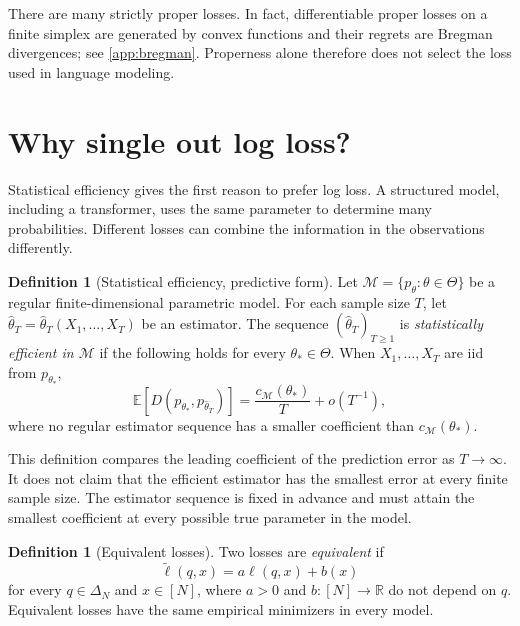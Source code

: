 \documentclass[11pt,twoside]{article}
\newcommand{\R}{\mathbb R}
\newcommand{\KL}{D}
\theoremstyle{definition}
\newtheorem{definition}[theorem]{Definition}
\theoremstyle{remark}
\begin{document}
There are many strictly proper losses. In fact, differentiable proper losses
on a finite simplex are generated by convex functions and their regrets are
Bregman divergences; see \cref{app:bregman}. Properness alone therefore does
not select the loss used in language modeling.

\section{Why single out log loss?}
\label{sec:why-log-loss}

Statistical efficiency gives the first reason to prefer log loss. A structured
model, including a transformer, uses the same parameter to determine many
probabilities. Different losses can combine the information in the observations
differently.

\begin{definition}[Statistical efficiency, predictive form]
\label{def:statistical-efficiency}
Let $\mathcal M=\{p_\theta:\theta\in\Theta\}$ be a regular finite-dimensional
parametric model. For each sample size $T$, let
$\widehat\theta_T=\widehat\theta_T(X_1,\ldots,X_T)$ be an estimator. The
sequence $(\widehat\theta_T)_{T\ge1}$ is \emph{statistically efficient in
$\mathcal M$} if the following holds for every $\theta_*\in\Theta$. When
$X_1,\ldots,X_T$ are iid from $p_{\theta_*}$,
\begin{equation}
\mathbb E\!\left[
\KL(p_{\theta_*}, p_{\widehat\theta_T})
\right]
=\frac{c_{\mathcal M}(\theta_*)}{T}+o(T^{-1}),
\label{eq:efficiency-definition}
\end{equation}
where no regular estimator sequence has a smaller coefficient than
$c_{\mathcal M}(\theta_*)$.
\end{definition}

This definition compares the leading coefficient of the prediction error as
$T\to\infty$. It does not claim that the efficient estimator has the smallest
error at every finite sample size. The estimator sequence is fixed in advance
and must attain the smallest coefficient at every possible true parameter in
the model.

\begin{definition}[Equivalent losses]
\label{def:equivalent-losses}
Two losses are \emph{equivalent} if
\begin{equation}
\widetilde\ell(q,x)=a\ell(q,x)+b(x)
\label{eq:equivalent-losses}
\end{equation}
for every $q\in\Delta_N$ and $x\in[N]$, where $a>0$ and
$b:[N]\to\R$ do not depend on $q$.
Equivalent losses have the same empirical minimizers in every model.
\end{definition}
\end{document}
